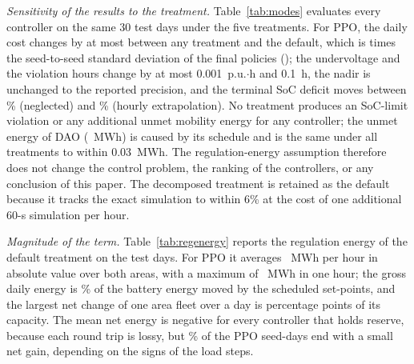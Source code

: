 \emph{Sensitivity of the results to the treatment.}
Table~\ref{tab:modes} evaluates every controller on the same 30 test
days under the five treatments. For PPO, the daily cost changes by at
most \ModeDeltaCostHour{} between any treatment and the default, which
is \ModeDeltaCostSdHour{} times the seed-to-seed standard deviation of
the final policies (\PPOSeedSd); the undervoltage and the violation hours change by at
most 0.001~p.u.$\cdot$h and 0.1~h, the nadir is unchanged to the
reported precision, and the terminal SoC deficit moves between
\ModeNonePPOSocDefPct\% (neglected) and \ModeHourPPOSocDefPct\%
(hourly extrapolation). No treatment produces an SoC-limit violation
or any additional unmet mobility energy for any controller; the unmet
energy of DAO (\ModeDecomposedDAOUnmetMwh~MWh) is caused by its
schedule and is the same under all treatments to within 0.03~MWh. The regulation-energy assumption therefore does not change
the control problem, the ranking of the controllers, or any
conclusion of this paper. The decomposed treatment is retained as the
default because it tracks the exact simulation to within 6\% at the
cost of one additional 60-s simulation per hour.



\emph{Magnitude of the term.} Table~\ref{tab:regenergy} reports the
regulation energy of the default treatment on the test days. For PPO it
averages \RegPPOHrMean~MWh per hour in absolute value over both areas,
with a maximum of \RegPPOHrMax~MWh in one hour; the gross daily energy
is \RegPPOShareGross\% of the battery energy moved by the scheduled
set-points, and the largest net change of one area fleet over a day is
\RegPPOSocAreaMax{} percentage points of its capacity. The mean net
energy is negative for every controller that holds reserve, because
each round trip is lossy, but \RegPPOPosDaysPct\% of the PPO seed-days
end with a small net gain, depending on the signs of the load steps.



